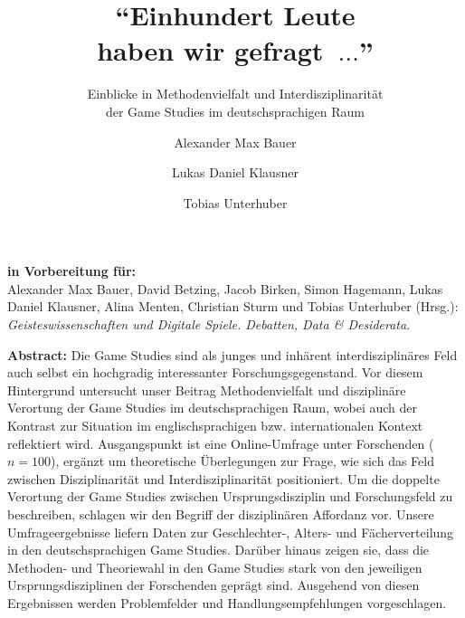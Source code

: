 \documentclass{scrartcl}
\title{\enquote{Einhundert Leute\\haben wir gefragt~$\ldots$}}
\subtitle{Einblicke in Methodenvielfalt und Interdisziplinarität\\der Game Studies im deutschsprachigen Raum}
\author[1]{Alexander Max Bauer}
\author[2]{Lukas Daniel Klausner}
\author[3]{Tobias Unterhuber}
\affil[1]{ Carl von Ossietzky Universität Oldenburg, Institut für Philosophie}
\affil[2]{ Fachhochschule St. Pölten, Institut für IT Sicherheitsforschung}
\affil[3]{ Universität Innsbruck, Institut für Germanistik}
\date{}
\begin{document}
\maketitle
\thispagestyle{empty}

\begin{center}
   \textbf{\textsf{in Vorbereitung für:}}\\
   Alexander Max Bauer, David Betzing, Jacob Birken, Simon Hagemann, Lukas Daniel Klausner, Alina Menten, Christian Sturm und Tobias Unterhuber (Hrsg.): \textit{Geisteswissenschaften und Digitale Spiele. Debatten, Data \& Desiderata}.
\end{center}

\vfill
\noindent\textbf{\textsf{Abstract:}}
Die Game Studies sind als junges und inhärent interdisziplinäres Feld auch selbst ein hochgradig interessanter Forschungsgegenstand.
Vor diesem Hintergrund untersucht unser Beitrag Methodenvielfalt und disziplinäre Verortung der Game Studies im deutschsprachigen Raum, wobei auch der Kontrast zur Situation im englischsprachigen bzw. internationalen Kontext reflektiert wird.
Ausgangspunkt ist eine Online-Umfrage unter Forschenden ($n = 100$), ergänzt um theoretische Überlegungen zur Frage, wie sich das Feld zwischen Disziplinarität und Interdisziplinarität positioniert.
Um die doppelte Verortung der Game Studies zwischen Ursprungsdisziplin und Forschungsfeld zu beschreiben, schlagen wir den Begriff der disziplinären Affordanz vor.
Unsere Umfrageergebnisse liefern Daten zur Geschlechter-, Alters- und Fächerverteilung in den deutschsprachigen Game Studies.
Darüber hinaus zeigen sie, dass die Methoden- und Theoriewahl in den Game Studies stark von den jeweiligen Ursprungsdisziplinen der Forschenden geprägt sind.
Ausgehend von diesen Ergebnissen werden Problemfelder und Handlungsempfehlungen vorgeschlagen.


\newpage
\end{document}
